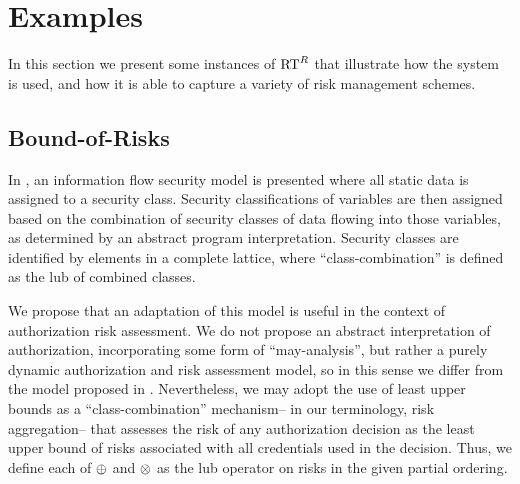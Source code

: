 \section{Examples}
\label{section-examples}

In this section we present some instances of $\text{RT}^R$ that illustrate
how the system is used, and how it is able to capture a variety of
risk management schemes.  

\subsection{Bound-of-Risks}  
\label{section-examples-bounds}

In \cite{Den:latt}, an information flow security model is presented
where all static data is assigned to a security class.  Security
classifications of variables are then assigned based on the
combination of security classes of data flowing into those variables,
as determined by an abstract program interpretation.  Security classes
are identified by elements in a complete lattice, where
``class-combination'' is defined as the lub of combined classes.

We propose that an adaptation of this model is useful in the context
of authorization risk assessment.  We do not propose an abstract
interpretation of authorization, incorporating some form of
``may-analysis'', but rather a purely dynamic authorization and risk
assessment model, so in this sense we differ from the model proposed
in \cite{Den:latt}.  Nevertheless, we may adopt the use of least upper
bounds as a ``class-combination'' mechanism-- in our terminology,
risk aggregation-- that assesses the risk of any authorization
decision as the least upper bound of risks associated with all
credentials used in the decision.  Thus, we define each of
$\oplus$ and $\otimes$ as the lub operator on
risks in the given partial ordering.


